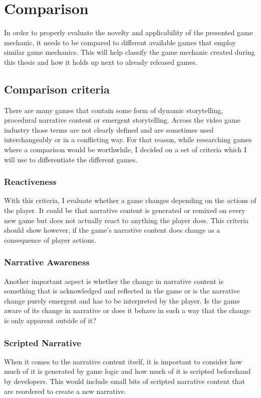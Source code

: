 \chapter{Comparison} %
In order to properly evaluate the novelty and applicability of the presented game mechanic, it needs to be compared to different available games that employ similar game mechanics. This will help classify the game mechanic created during this thesis and how it holds up next to already released games.
\section{Comparison criteria}
There are many games that contain some form of dynamic storytelling, procedural narrative content or emergent storytelling. Across the video game industry those terms are not clearly defined and are sometimes used interchangeably or in a conflicting way. For that reason, while researching games where a comparison would be worthwhile, I decided on a set of criteria which I will use to differentiate the different games.
\subsection{Reactiveness}
With this criteria, I evaluate whether a game changes depending on the actions of the player. It could be that narrative content is generated or remixed on every new game but does not actually react to anything the player does. This criteria should show however, if the game's narrative content does change as a consequence of player actions.
\subsection{Narrative Awareness}
Another important aspect is whether the change in narrative content is something that is acknowledged and reflected in the game or is the narrative change purely emergent and has to be interpreted by the player. Is the game aware of its change in narrative or does it behave in such a way that the change is only apparent outside of it?
\subsection{Scripted Narrative}
When it comes to the narrative content itself, it is important to consider how much of it is generated by game logic and how much of it is scripted beforehand by developers. This would include small bits of scripted narrative content that are reordered to create a new narrative.
